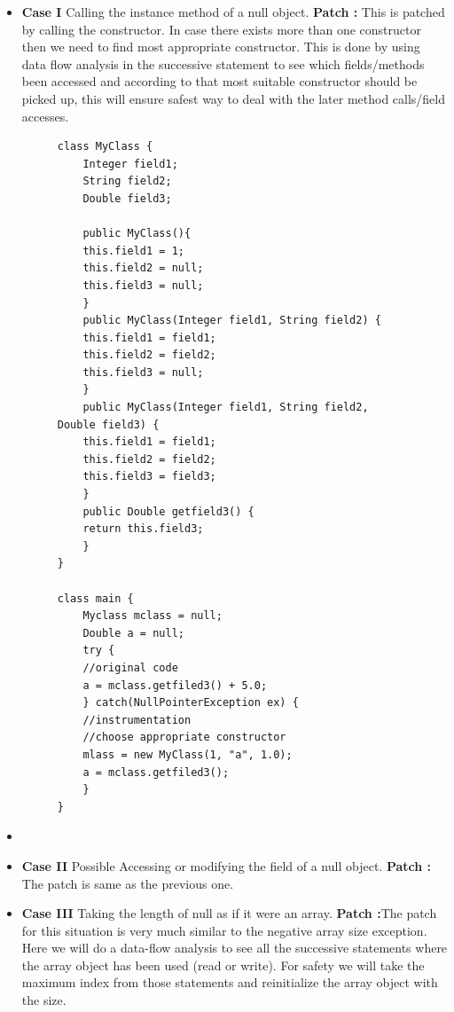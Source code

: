 \begin{itemize}
  \item \textbf{Case I} Calling the instance method of a null object. \newline
  \textbf{Patch :} This is patched by calling the constructor. In case there
  exists more than one constructor then we need to find most appropriate
  constructor. This is done by using data flow analysis in the successive
  statement to see which fields/methods been accessed and according to that
  most suitable constructor should be picked up, this will ensure safest way to
  deal with the later method calls/field accesses.
  
  \lstset{language=Java, caption=appropriate constructor,
label=patchingexample2}

\begin{figure}[t]
\begin{lstlisting}[countblanklines=false]
class MyClass {
    Integer field1;
    String field2;
    Double field3;

    public MyClass(){
	this.field1 = 1;
	this.field2 = null;
	this.field3 = null;
    }
    public MyClass(Integer field1, String field2) {
	this.field1 = field1;
	this.field2 = field2;
	this.field3 = null;
    }
    public MyClass(Integer field1, String field2, Double field3) {
	this.field1 = field1;
	this.field2 = field2;
	this.field3 = field3;
    }
    public Double getfield3() {
	return this.field3;
    }
}

class main {
    Myclass mclass = null;
    Double a = null;
    try {
	//original code
	a = mclass.getfiled3() + 5.0;
    } catch(NullPointerException ex) {
	//instrumentation
	//choose appropriate constructor
	mlass = new MyClass(1, "a", 1.0);
	a = mclass.getfiled3();
    }
}
\end{lstlisting}
\end{figure}

  \item 
  
  \item \textbf{Case II} Possible Accessing or modifying the field of a null
  object.\newline
  \textbf{Patch :} The patch is same as the previous one.
  
  \item \textbf{Case III} Taking the length of null as if it were an
  array.\newline
  \textbf{Patch :}The patch for this situation is very much similar to the
  negative array size exception. Here we will do a data-flow analysis to see all
  the successive statements where the array object has been used (read or
  write). For safety we will take the maximum index from those statements and
  reinitialize the array object with the size.
    

\end{itemize}
